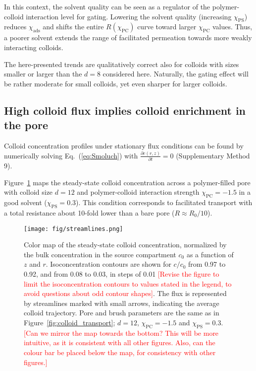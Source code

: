 \documentclass[12pt, a4paper]{article}
\newcommand\todo[1]{\textcolor{red}{#1}}
\begin{document}
In this context, the solvent quality can be seen as a regulator of the polymer-colloid interaction level for gating. 
Lowering the solvent quality (increasing $\chi_{\text{PS}}$) reduces $\chi_{\text{ads}}$ and shifts the entire $R(\chi_{\text{PC}})$ curve toward larger $\chi_{\text{PC}}$ values.
Thus, a poorer solvent extends the range of facilitated permeation towards more weakly interacting colloids.

The here-presented trends are qualitatively correct also for colloids with sizes smaller or larger than the $d=8$ considered here.
Naturally, the gating effect will be rather moderate for small colloids, yet even sharper for larger colloids.


\subsection{High colloid flux implies colloid enrichment in the pore}

Colloid concentration profiles under stationary flux conditions can be found by numerically solving Eq.~(\ref{eq:Smoluch}) with $\frac{\partial c(r,z)}{\partial t} = 0$  (Supplementary Method 9). 

Figure~\ref{fig:colloid_concentration} maps the steady-state colloid concentration across a polymer-filled pore with colloid size $d = 12$ and polymer-colloid interaction strength $\chi_{\text{PC}} = -1.5$ in a good solvent ($\chi_{\text{PS}} = 0.3$).
This condition corresponds to facilitated transport with a total resistance about 10-fold lower than a bare pore ($R \approx R_0/10$).

\begin{figure}
    \centering
    \texttt{[image: fig/streamlines.png]}
    \caption{
    Color map of the steady-state colloid concentration, normalized by the bulk concentration in the source compartment $c_0$ as a function of $z$ and $r$.
    Isoconcentration contours are shown for $c/c_0$ from 0.97 to 0.92, and from 0.08 to 0.03, in steps of 0.01
    \todo{[Revise the figure to limit the isoconcentration contours to values stated in the legend, to avoid questions about odd contour shapes]}.
    The flux is represented by streamlines marked with small arrows, indicating the average colloid trajectory.
    Pore and brush parameters are the same as in Figure~\ref{fig:colloid_transport}; $d = 12$, $\chi_{\text{PC}} = -1.5$ and $\chi_{\text{PS}} = 0.3$.
    \todo{[Can we mirror the map towards the bottom? This will be more intuitive, as it is consistent with all other figures. Also, can the colour bar be placed below the map, for consistency with other figures.]}
    }
    \label{fig:colloid_concentration}
\end{figure}
\end{document}
